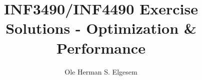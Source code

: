 
\title{\vspace{-2cm}INF3490/INF4490 Exercise Solutions - Optimization & Performance}
\author{Ole Herman S. Elgesem}
\date{}

\setlength\parindent{0pt}


    \renewcommand\marginsymbol[1][0pt]{%
  \tabto*{0cm}\makebox[-1cm][c]{$\mathbb{P}$}\tabto*{\TabPrevPos}}

\maketitle



